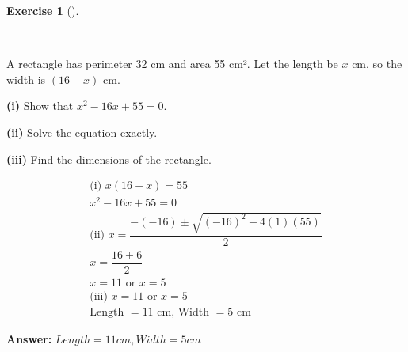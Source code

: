 \documentclass[
  letterpaper,
  DIV=11,
  numbers=noendperiod]{scrreprt}
\theoremstyle{definition}
\newtheorem{exercise}{Exercise}[chapter]
\theoremstyle{remark}
\begin{document}
\begin{exercise}[]\protect\hypertarget{exr-u6-21-2}{}\label{exr-u6-21-2}

~

A rectangle has perimeter 32 cm and area 55 cm². Let the length be \(x\)
cm, so the width is \((16 - x)\) cm.

\textbf{(i)} Show that \(x^2 - 16x + 55 = 0\).

\textbf{(ii)} Solve the equation exactly.

\textbf{(iii)} Find the dimensions of the rectangle.

\begin{tcolorbox}[enhanced jigsaw, opacitybacktitle=0.6, coltitle=black, arc=.35mm, colframe=quarto-callout-tip-color-frame, colback=white, bottomrule=.15mm, left=2mm, colbacktitle=quarto-callout-tip-color!10!white, titlerule=0mm, opacityback=0, title=\textcolor{quarto-callout-tip-color}{\faLightbulb}\hspace{0.5em}{🔍 View Solution}, leftrule=.75mm, breakable, rightrule=.15mm, bottomtitle=1mm, toptitle=1mm, toprule=.15mm]

\begin{align*}
\text{(i) } x(16 - x) = 55 \\ x^2 - 16x + 55 = 0 \\ \text{(ii) } x = \dfrac{-(-16) \pm \sqrt{(-16)^2 - 4(1)(55)}}{2} \\ x = \dfrac{16 \pm 6}{2} \\ x = 11 \text{ or } x = 5 \\ \text{(iii) } x = 11 \text{ or } x = 5 \\ \text{Length } = 11 \text{ cm, Width } = 5 \text{ cm}
\end{align*}

\textbf{Answer:} \(Length = 11 cm, Width = 5 cm\)

\end{tcolorbox}

\end{exercise}
\end{document}
